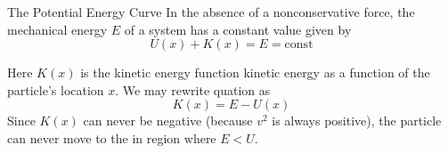 \documentclass[18pt]{LectMechanics}
\begin{document}
\begin{frame}{The Potential Energy Curve}{}
	In the absence of a nonconservative force, the mechanical energy $E$ of a system has a constant value given by \begin{equation*}
		U(x) + K(x) = E = \mathrm{const}
	\end{equation*}

	Here $K(x)$ is the kinetic energy function kinetic energy as a function of the particle's location $x$. We may rewrite quation as
	\begin{equation*}
		K(x) = E - U(x)
	\end{equation*}
	Since $K(x)$ can never be negative (because $v^2$ is always positive), the particle can never move to the in region where $E < U$.
\end{frame}
\end{document}
